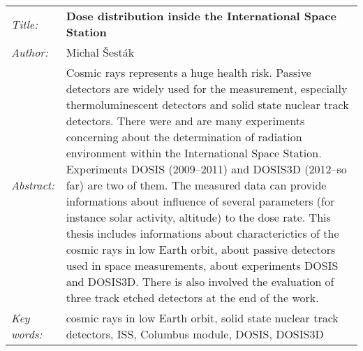 \begin{tabularx}{\textwidth}{>{\itshape}l X}
  Title: & \textbf{Dose distribution inside the International Space Station}\\
  Author: & Michal Šesták\\
  Abstract: & Cosmic rays represents a huge health risk. Passive detectors are widely used for the measurement, especially thermoluminescent detectors and solid state nuclear track detectors. There were and are many experiments concerning about the determination of radiation environment within the International Space Station. Experiments DOSIS (2009--2011) and DOSIS3D (2012--so far) are two of them. The measured data can provide informations about influence of several parameters (for instance solar activity, altitude) to the dose rate. This thesis includes informations about characterictics of the cosmic rays in low Earth orbit, about passive detectors used in space measurements, about experiments DOSIS and DOSIS3D. There is also involved the evaluation of three track etched detectors at the end of the work.\\
  Key words: & cosmic rays in low Earth orbit, solid state nuclear track detectors, ISS, Columbus module, DOSIS, DOSIS3D
\end{tabularx}
\newpage 

